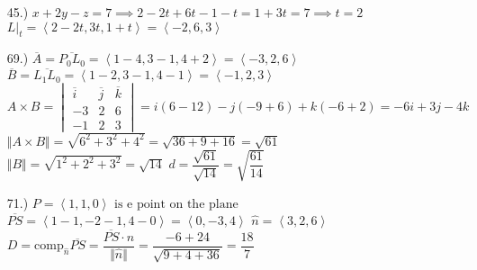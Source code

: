 \documentclass[12pt]{article}
\newcommand{\angleb}[1]{\left\langle#1\right\rangle}
\begin{document}
\begin{itemize}
	\item [45.)] $x+2y-z=7\implies2-2t+6t-1-t=1+3t=7\implies t=2$\newline
	      $L|_t=\angleb{2-2t,3t,1+t}=\angleb{-2,6,3}$

	\item [69.)] $\overline{A}=\overline{P_0L_0}=\angleb{1-4,3-1,4+2}=\angleb{-3,2,6}$\newline
	      $\overline{B}=\overline{L_1L_0}=\angleb{1-2,3-1,4-1}=\angleb{-1,2,3}$\newline
	      $A\times B=\begin{vmatrix}
			      \overline{i} & \overline{j} & \overline{k} \\
			      -3           & 2            & 6            \\-1 & 2 & 3
		      \end{vmatrix}=i(6-12)-j(-9+6)+k(-6+2)=-6i+3j-4k$\newline
	      $\Vert A\times B\Vert=\sqrt{6^2+3^2+4^2}=\sqrt{36+9+16}=\sqrt{61}$\newline
	      $\Vert B\Vert=\sqrt{1^2+2^2+3^2}=\sqrt{14}$\newline
	      $d=\dfrac{\sqrt{61}}{\sqrt{14}}=\sqrt{\dfrac{61}{14}}$

	\item [71.)] $P=\angleb{1,1,0}\text{ is e point on the plane}$\newline
	      $\overline{PS}=\angleb{1-1,-2-1,4-0}=\angleb{0,-3,4}$\newline
	      $\hat{n}=\angleb{3,2,6}$\newline
	      $D=\text{comp}_{\hat{n}}\overline{PS}=\dfrac{\overline{PS}\cdot\hat{n}}{\Vert\hat{n}\Vert}=\dfrac{-6+24}{\sqrt{9+4+36}}=\dfrac{18}{7}$
\end{itemize}
\end{document}
